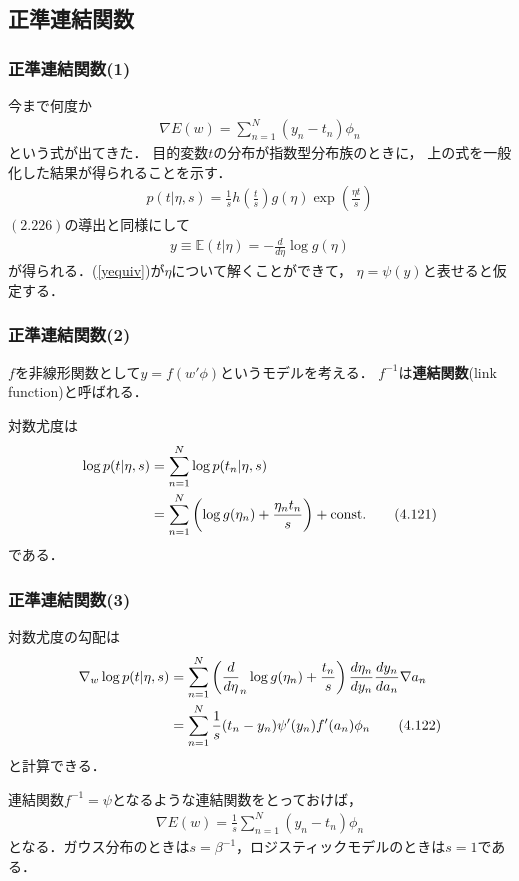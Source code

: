 \documentclass[10pt,%
hyperref={unicode}]{beamer}
\newcommand{\braref}[1]{{\fontfamily{cmr}\selectfont (\ref{#1})}}
\begin{document}
\subsection{正準連結関数}
\begin{frame}
    \frametitle{正準連結関数(1)}
    今まで何度か
    \begin{align*}
        \nabla E (w) = \sum_{n = 1}^N (y_n - t_n) \phi_n
    \end{align*}
    という式が出てきた．
    目的変数$t$の分布が指数型分布族のときに，
    上の式を一般化した結果が得られることを示す．
    \begin{align}
        p(t|\eta,s) = \frac{1}{s}h\left(\frac{t}{s}\right)g(\eta)\exp\left(\frac{\eta t}{s}\right) \tag{4.118}
    \end{align}
    $(2.226)$の導出と同様にして
    \begin{align}
        y \equiv \mathbb{E}(t|\eta) = - \frac{d}{d\eta}\log g(\eta) \tag{4.119} \label{yequiv}
    \end{align}
    が得られる．\braref{yequiv}が$\eta$について解くことができて，
    $\eta = \psi(y)$と表せると仮定する．
\end{frame}

\begin{frame}
    \frametitle{正準連結関数(2)}
    $f$を非線形関数として$y = f(w'\phi)$というモデルを考える．
    $f^{-1}$は\textbf{連結関数}(link function)と呼ばれる．

    \bigskip

    対数尤度は
    \begin{align}
        \log p (t|\eta,s) &= \sum_{n = 1}^N \log p(t_n|\eta,s) \notag \\
                          &= \sum_{n = 1}^N \left(\log g(\eta_n) + \frac{\eta_n t_n}{s}\right) + \mathrm{const.} \tag{4.121}
    \end{align}
    である．
\end{frame}

\begin{frame}
    \frametitle{正準連結関数(3)}
    対数尤度の勾配は
    \begin{align}
        \nabla_w \log p(t|\eta,s)
        &= \sum_{n = 1}^N \left(\frac{d}{d\eta}_n \log g(\eta_n) + \frac{t_n}{s} \right)\frac{d\eta_n}{dy_n}\frac{dy_n}{da_n}\nabla a_n \notag \\
        &= \sum_{n = 1}^N \frac{1}{s}(t_n - y_n)\psi'(y_n)f'(a_n)\phi_n \tag{4.122}
    \end{align}
    と計算できる．

    \bigskip

    連結関数$f^{-1}=\psi$となるような連結関数をとっておけば，
    \begin{align}
        \nabla E(w) = \frac{1}{s}\sum_{n = 1}^N (y_n - t_n) \phi_n \tag{4.124}
    \end{align}
    となる．ガウス分布のときは$s=\beta^{-1}$，ロジスティックモデルのときは$s = 1$である．
\end{frame}
\end{document}
